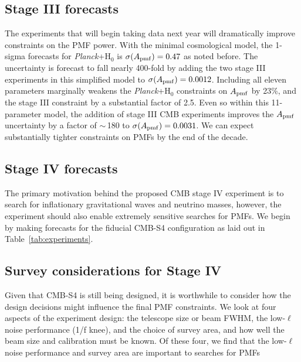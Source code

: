 \documentclass[preprint]{emulateapj}
\newcommand{\apmf}{\ensuremath{A_{\rm pmf}}}
\newcommand{\ho}{H\ensuremath{_0}}
\newcommand{\planck}{{\sl Planck}}
\begin{document}
\subsection{Stage III forecasts}

The experiments that will begin taking data next year will dramatically improve constraints on the PMF power. 
With the minimal cosmological model, the 1-sigma forecasts for \planck{}+\ho{} is $\sigma(\apmf)=0.47$ as noted before.  
The uncertainty is forecast to fall nearly 400-fold by adding the two stage III experiments in this simplified model to $\sigma(\apmf)=0.0012$. 
Including all eleven parameters marginally weakens the \planck+\ho{} constraints on \apmf{} by 23\%, and the stage III constraint by a substantial factor of 2.5. 
Even so within this 11-parameter model, the addition of stage III CMB experiments improves the \apmf{} uncertainty by a factor of $\sim$\,180 to  $\sigma(\apmf)=0.0031$. 
We can expect substantially tighter constraints on PMFs by the end of the decade. 

\subsection{Stage IV forecasts}

The primary motivation behind the proposed CMB stage IV experiment is to search for inflationary gravitational waves and neutrino masses, however, the experiment should also enable extremely sensitive searches for PMFs. 
We begin by making forecasts for the fiducial CMB-S4 configuration as laid out in Table~\ref{tab:experiments}. 



\subsection{Survey considerations for Stage IV}

Given that CMB-S4 is still being designed, it is worthwhile to consider how the design decisions might influence the final PMF constraints. 
We look at four aspects of the experiment design: the telescope size or beam FWHM, the low-$\ell$ noise performance (1/f knee), and the choice of survey area, and how well the beam size and calibration must be known. 
Of these four, we find that the low-$\ell$ noise performance and survey area are important to searches for PMFs 
\end{document}
